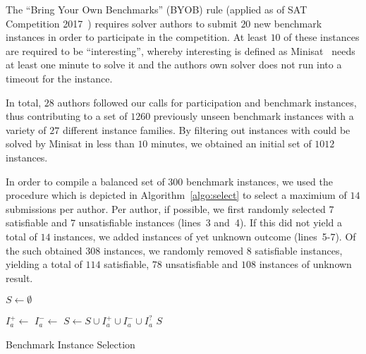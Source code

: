 \documentclass{elsarticle}
\begin{document}
The ``Bring Your Own Benchmarks'' (BYOB) rule (applied as of SAT Competition 2017~\cite{SC2017}) requires solver authors to submit $20$ new benchmark instances in order to participate in the competition. At least $10$ of these instances are required to be ``interesting'', whereby interesting is defined as Minisat~\cite{Niklas:2003:Minisat} needs at least one minute to solve it and the authors own solver does not run into a timeout for the instance. 

In total, $28$ authors followed our calls for participation and benchmark instances, thus contributing to a set of $1260$ previously unseen benchmark instances with a variety of $27$ different instance families. 
By filtering out instances with could be solved by Minisat in less than $10$ minutes, we obtained an initial set of $1012$ instances. 

In order to compile a balanced set of $300$ benchmark instances, we used the procedure which is depicted in Algorithm~\ref{algo:select} to select a maximium of $14$ submissions per author. 
Per author, if possible, we first randomly selected $7$ satisfiable and $7$ unsatisfiable instances (lines~3 and~4). 
If this did not yield a total of $14$ instances, we added instances of yet unknown outcome (lines~5-7). 
Of the such obtained $308$ instances, we randomly removed $8$ satisfiable instances, yielding a total of $114$ satisfiable, $78$ unsatisfiable and $108$ instances of unknown result. 

\begin{algorithm}[t]
\DontPrintSemicolon

\BlankLine
$S \leftarrow \emptyset$\;

 {
	$I_a^+ \leftarrow$ \;	
	$I_a^- \leftarrow$ \;	
	$S \leftarrow S \cup I_a^+ \cup I_a^- \cup I_a^?$\;	
}
\Return $S$\;

\caption{Benchmark Instance Selection}
\label{algo:select}
\end{algorithm}
\end{document}
